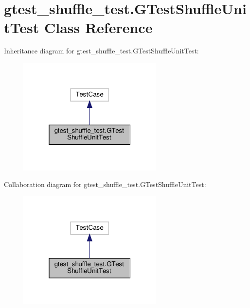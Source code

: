 \hypertarget{classgtest__shuffle__test_1_1_g_test_shuffle_unit_test}{}\section{gtest\+\_\+shuffle\+\_\+test.\+G\+Test\+Shuffle\+Unit\+Test Class Reference}
\label{classgtest__shuffle__test_1_1_g_test_shuffle_unit_test}


Inheritance diagram for gtest\+\_\+shuffle\+\_\+test.\+G\+Test\+Shuffle\+Unit\+Test\+:
\nopagebreak
\begin{figure}[H]
\begin{center}
\leavevmode
\includegraphics[width=205pt]{classgtest__shuffle__test_1_1_g_test_shuffle_unit_test__inherit__graph}
\end{center}
\end{figure}


Collaboration diagram for gtest\+\_\+shuffle\+\_\+test.\+G\+Test\+Shuffle\+Unit\+Test\+:
\nopagebreak
\begin{figure}[H]
\begin{center}
\leavevmode
\includegraphics[width=205pt]{classgtest__shuffle__test_1_1_g_test_shuffle_unit_test__coll__graph}
\end{center}
\end{figure}

